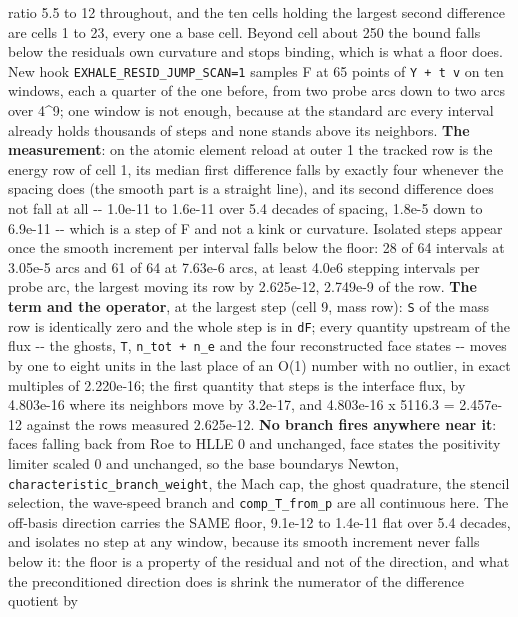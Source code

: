 \documentclass[english,a4paper]{my_memo}
\begin{document}
\begin{itemize}
  ratio 5.5 to 12 throughout, and the ten cells holding the largest
  second difference are cells 1 to 23, every one a base cell. Beyond
  cell about 250 the bound falls below the residual\textquotesingle s own curvature and
  stops binding, which is what a floor does. New hook
  \texttt{EXHALE\_RESID\_JUMP\_SCAN=1} samples F at 65 points of \texttt{Y\ +\ t\ v} on ten
  windows, each a quarter of the one before, from two probe arcs down to
  two arcs over 4\^{}9; one window is not enough, because at the standard
  arc every interval already holds thousands of steps and none stands
  above its neighbors. \textbf{The measurement}: on the atomic element
  reload at outer 1 the tracked row is the energy row of cell 1, its
  median first difference falls by exactly four whenever the spacing
  does (the smooth part is a straight line), and its second difference
  does not fall at all -\/- 1.0e-11 to 1.6e-11 over 5.4 decades of
  spacing, 1.8e-5 down to 6.9e-11 -\/- which is a step of F and not a kink
  or curvature. Isolated steps appear once the smooth increment per
  interval falls below the floor: 28 of 64 intervals at 3.05e-5 arcs and
  61 of 64 at 7.63e-6 arcs, at least 4.0e6 stepping intervals per probe
  arc, the largest moving its row by 2.625e-12, 2.749e-9 of the row.
  \textbf{The term and the operator}, at the largest step (cell 9, mass row):
  \texttt{S} of the mass row is identically zero and the whole step is in \texttt{dF};
  every quantity upstream of the flux -\/- the ghosts, \texttt{T}, \texttt{n\_tot\ +\ n\_e}
  and the four reconstructed face states -\/- moves by one to eight units
  in the last place of an O(1) number with no outlier, in exact
  multiples of 2.220e-16; the first quantity that steps is the interface
  flux, by 4.803e-16 where its neighbors move by 3.2e-17, and
  4.803e-16 x 5116.3 = 2.457e-12 against the row\textquotesingle s measured 2.625e-12.
  \textbf{No branch fires anywhere near it}: faces falling back from Roe to
  HLLE 0 and unchanged, face states the positivity limiter scaled 0 and
  unchanged, so the base boundary\textquotesingle s Newton, \texttt{characteristic\_branch\_weight},
  the Mach cap, the ghost quadrature, the stencil selection, the
  wave-speed branch and \texttt{comp\_T\_from\_p} are all continuous here. The
  off-basis direction carries the SAME floor, 9.1e-12 to 1.4e-11 flat
  over 5.4 decades, and isolates no step at any window, because its
  smooth increment never falls below it: the floor is a property of the
  residual and not of the direction, and what the preconditioned
  direction does is shrink the numerator of the difference quotient by

\end{itemize}
\end{document}
